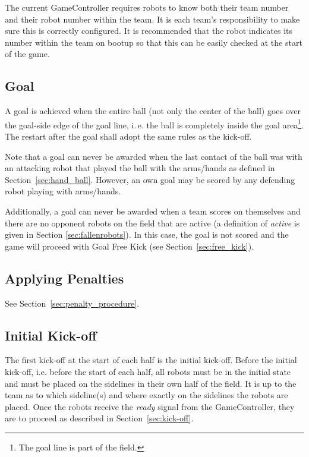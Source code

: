 \documentclass[12pt]{article}
\newcommand{\ie}{\mbox{i.\,e.}\xspace}
\begin{document}
The current GameController requires robots to know both their team number and their robot number within the team. It is each team's responsibility to make sure this is correctly configured. It is recommended that the robot indicates its number within the team on bootup so that this can be easily checked at the start of the game.

\subsection{Goal}
\label{sec:goal}
A goal is achieved when the entire ball (not only the center of the ball) goes over the goal-side edge of the goal line, \ie the ball is completely inside the goal area\footnote{The goal line is part of the field.}. The restart after the goal shall adopt the same rules as the kick-off.

Note that a goal can never be awarded when the last contact of the ball was with an attacking robot that played the ball with the arms/hands as defined in Section~\ref{sec:hand_ball}. However, an own goal may be scored by any defending robot playing with arms/hands.

Additionally, a goal can never be awarded when a team scores on themselves and there are no opponent robots on the field that are active (a definition of \emph{active} is given in Section \ref{sec:fallenrobots}).  In this case, the goal is not scored and the game will proceed with Goal Free Kick (see Section~\ref{sec:free_kick}).

\subsection{Applying Penalties}

See Section~\ref{sec:penalty_procedure}.


\subsection{Initial Kick-off}
\label{sec:initial-kick-off}

The first kick-off at the start of each half is the initial kick-off.
Before the initial kick-off, i.e. before the start of each half, all robots must be in the initial state and must be placed on the sidelines in their own half of the field.
It is up to the team as to which sideline(s) and where exactly on the sidelines the robots are placed.
Once the robots receive the \emph{ready} signal from the GameController, they are to proceed as described in Section~\ref{sec:kick-off}.
\end{document}
